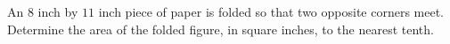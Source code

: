 An $8$ inch by $11$ inch piece of paper is folded so that two opposite corners meet. Determine the area of the folded figure, in square inches, to the nearest tenth.
